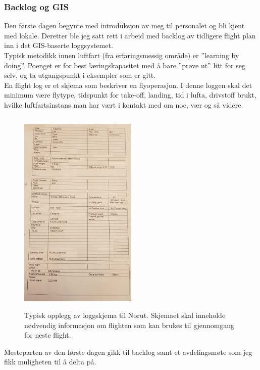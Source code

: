 \documentclass[12pt, a4paper]{report}
\begin{document}
\subsubsection{Backlog og GIS}
Den første dagen begynte med introduksjon av meg til personalet og bli kjent med lokale. Deretter ble jeg satt rett i arbeid med backlog av tidligere flight plan inn i det GIS-baserte loggsystemet. \\
Typisk metodikk innen luftfart (fra erfaringsmessig område) er ''learning by doing''. Poenget er for best læringskapasitet med å bare ''prøve ut'' litt for seg selv, og ta utgangspunkt i eksempler som er gitt.\\
En flight log er et skjema som beskriver en flyoperasjon. I denne loggen skal det minimum være flytype, tidspunkt for take-off, landing, tid i lufta, drivstoff brukt, hvilke luftfartsinstans man har vært i kontakt med om noe, vær og så videre. %

\begin{figure}[h]
	\centering
	\includegraphics[height= 10cm, width=0.5\textwidth]{flightlogNorut.png}
		\caption{Typisk opplegg av loggskjema til Norut. Skjemaet skal inneholde nødvendig informasjon om flighten som kan brukes til gjennomgang for neste flight. }
\end{figure}
\newpage
Mesteparten av den første dagen gikk til backlog samt et avdelingsmøte som jeg fikk muligheten til å delta på.\\
\end{document}
